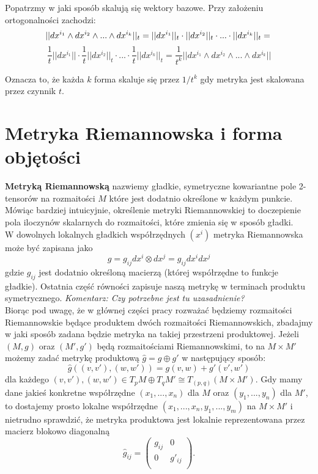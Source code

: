 \documentclass[licencjacka]{pracamgr}
\theoremstyle{definition}
\theoremstyle{definition}
\theoremstyle{plain}
\theoremstyle{plain}
\theoremstyle{plain}
\begin{document}
Popatrzmy w jaki sposób skalują się wektory bazowe. Przy założeniu ortogonalności
zachodzi:
\[
    ||dx^{i_1} \wedge dx^{i_2} \wedge ... \wedge dx^{i_k} ||_t =  
    ||dx^{i_1} ||_t \cdot ||  dx^{i_2} ||_t \cdot ... \cdot || dx^{i_k} ||_t =  \\
\]
\[
    \frac{1}{t}||dx^{i_1} || \cdot \frac{1}{t} ||  dx^{i_2} ||_t \cdot ...
     \cdot \frac{1}{t} || dx^{i_k} ||_t = 
    \frac{1}{t^k}||dx^{i_1} \wedge dx^{i_2} \wedge ... \wedge dx^{i_k} ||
\]

Oznacza to, że każda $k$ forma skaluje się przez $1/t^k$ gdy metryka
jest skalowana przez czynnik $t$.

\section{Metryka Riemannowska i forma objętości}

\textbf{Metryką Riemannowską} nazwiemy gładkie, symetryczne kowariantne
pole 2-tensorów na rozmaitości
$M$ które jest dodatnio określone w każdym punkcie. Mówiąc bardziej
intuicyjnie, określenie metryki Riemannowskiej to doczepienie 
pola iloczynów skalarnych do rozmaitości, które zmienia się w sposób gładki.
\\

W dowolnych lokalnych gładkich współrzędnych $(x^i)$ metryka Riemannowska
może być zapisana jako
\[ %
    g = g_{ij} dx^i \otimes dx^j = g_{ij} dx^i dx^j
\]
gdzie
$g_{ij}$
jest dodatnio określoną macierzą (której współrzędne to funkcje gładkie). Ostatnia
część równości zapisuje naszą metrykę w terminach produktu symetrycznego.
\emph{Komentarz: Czy potrzebne jest tu uzasadnienie?} \\

Biorąc pod uwagę, że w głównej części pracy rozważać będziemy
rozmaitości Riemannowskie będące produktem dwóch rozmaitości
Riemannowskich, zbadajmy w jaki sposób zadana będzie metryka na takiej
przestrzeni produktowej. Jeżeli $(M, g)$ oraz $(M', g')$ będą rozmaitościami
Riemannowskimi, to na $M \times M'$ możemy zadać metrykę produktową
 $\hat g = g \oplus g'$ w następujący sposób:
\[
\hat g
 \left( (v, v'), (w, w') \right) =
 g(v, w) + g'(v', w')
\]
dla każdego
 $(v, v'), (w, w') \in T_p M \oplus T_q M' \cong T_{(p, q)} (M \times M')$.
Gdy mamy dane jakieś konkretne współrzędne $(x_1, ... , x_n)$ dla $M$ oraz
$(y_1, ..., y_n)$ dla $M'$, to dostajemy prosto lokalne współrzędne
$(x_1, ..., x_n, y_1, ..., y_m)$ na $M \times M'$ i nietrudno sprawdzić, 
że metryka produktowa jest lokalnie reprezentowana przez macierz blokowo diagonalną
\[
  \hat g_{ij}  = 
  \left(
    \begin{array}{cc}
     g_{ij}   &  0 \\
      0      & g'_{ij} \\
      \end{array}
  \right).
\] \\
\end{document}

